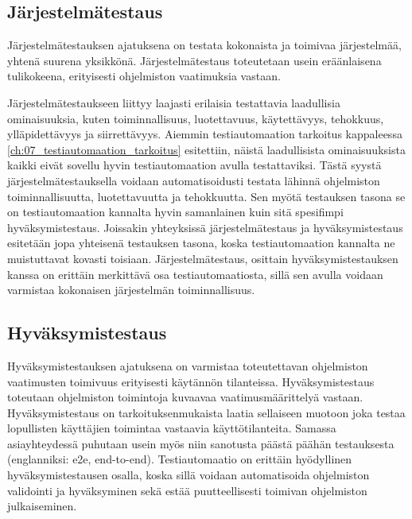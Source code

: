   \subsection{Järjestelmätestaus} \label{ch:07_jarjestelmatestaus}

  Järjestelmätestauksen ajatuksena on testata kokonaista ja toimivaa järjestelmää, yhtenä suurena yksikkönä.
  Järjestelmätestaus toteutetaan usein eräänlaisena tulikokeena, erityisesti ohjelmiston vaatimuksia vastaan.

  Järjestelmätestaukseen liittyy laajasti erilaisia testattavia laadullisia ominaisuuksia, kuten toiminnallisuus, luotettavuus, käytettävyys, tehokkuus, ylläpidettävyys ja siirrettävyys.
  Aiemmin testiautomaation tarkoitus kappaleessa \ref{ch:07_testiautomaation_tarkoitus} esitettiin, näistä laadullisista ominaisuuksista kaikki eivät sovellu hyvin testiautomaation avulla testattaviksi.
  Tästä syystä järjestelmätestauksella voidaan automatisoidusti testata lähinnä ohjelmiston toiminnallisuutta, luotettavuutta ja tehokkuutta.
  Sen myötä testauksen tasona se on testiautomaation kannalta hyvin samanlainen kuin sitä spesifimpi hyväksymistestaus.
  Joissakin yhteyksissä järjestelmätestaus ja hyväksymistestaus esitetään jopa yhteisenä testauksen tasona, koska testiautomaation kannalta ne muistuttavat kovasti toisiaan.
  Järjestelmätestaus, osittain hyväksymistestauksen kanssa on erittäin merkittävä osa testiautomaatiosta, sillä sen avulla voidaan varmistaa kokonaisen järjestelmän toiminnallisuus.

  \subsection{Hyväksymistestaus} \label{ch:07_hyvaksymistestaus}

  Hyväksymistestauksen ajatuksena on varmistaa toteutettavan ohjelmiston vaatimusten toimivuus erityisesti käytännön tilanteissa.
  Hyväksymistestaus toteutaan ohjelmiston toimintoja kuvaavaa vaatimusmäärittelyä vastaan.
  Hyväksymistestaus on tarkoituksenmukaista laatia sellaiseen muotoon joka testaa lopullisten käyttäjien toimintaa vastaavia käyttötilanteita.
  Samassa asiayhteydessä puhutaan usein myös niin sanotusta päästä päähän testauksesta (englanniksi: e2e, end-to-end).
  Testiautomaatio on erittäin hyödyllinen hyväksymistestausen osalla, koska sillä voidaan automatisoida ohjelmiston validointi ja hyväksyminen sekä estää puutteellisesti toimivan ohjelmiston julkaiseminen.

